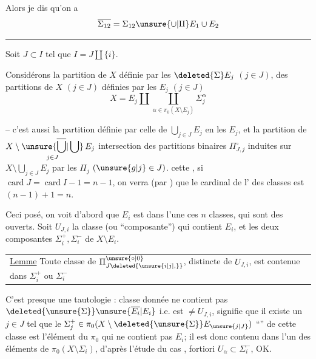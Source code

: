 Alors je dis qu'on a
\[
\overline{\Sigma_{12}}=\Sigma_{12}\unsure{\cup|\amalg} E_1\cup E_2
\]

\noindent\rule{2.4cm}{0.3pt}\par

\reversemarginpar
{}
\normalmarginpar
{}

Soit $J\subset I$ tel que $I=J\amalg\{i\}$.

Considérons la partition  de $X$  définie par les $\deleted{\Sigma}E_j$ $(j\in J)$,   des partitions  de $X$ $(j\in J)$ définies par les $E_j$  $(j\in J)$
\[
X=E_j\amalg\coprod_{\alpha\in\pi_0(X\setminus E_j)}\Sigma_j^\alpha
\]

-- c'est aussi la partition définie par celle de $\displaystyle\bigcup_{j\in J}E_j$ en les $E_j$, et la partition  de $\displaystyle X\setminus\mathop{\unsure{\overline{\bigcup}|\bigcup}}\limits_{j\in J}E_j$ intersection des partitions binaires $\Pi_{J,j}^{\circ}$  induites sur  $\displaystyle X\setminus\bigcup_{j\in J}E_j$ par les $\Pi_j$ $(\unsure{g|j}\in J)$. 
cette , si $\operatorname{card}J=\operatorname{card}I-1=n-1$, on verra (par ) que le cardinal de l' des classes est $(n-1)+1=n$.

Ceci posé, on voit d'abord que $E_i$ est dans l'une   ces $n$ classes, qui sont des ouverts. Soit $U_{J,i}$ la classe (ou ``composante'') qui contient $E_i$, et  les deux composantes $\Sigma_i^+,\Sigma_i^-$ de $X\setminus E_i$.

\noindent\begin{tabular}{@{}|p{.91\linewidth}@{}}
\uline{Lemme} Toute classe de $\Pi_{J\deleted{\unsure{i|j|,}}}^{\unsure{\circ|0}}$, distincte de $U_{J,i}$, est contenue dans $\Sigma_i^+$ ou $\Sigma_i^-$
\end{tabular}

C'est presque une tautologie :    classe donnée  ne contient pas $\deleted{\unsure{\Sigma}}\unsure{\overline{E_i}|E_i}$ i.e. est $\ne U_{J,i}$, signifie que il existe un $j\in J$ tel que le $\Sigma_j^+\in\pi_0(X\setminus \deleted{\unsure{\Sigma}}E_{\unsure{j|J}})$  ``'' de cette classe  est l'élément du $\pi_0$ qui ne contient pas $E_i$; il est donc contenu dans l'un des éléments  de $\pi_0(X\setminus\Sigma_i)$, d'après l'étude du cas  ,   fortiori $U_\alpha\subset\Sigma_i^-$, OK.
